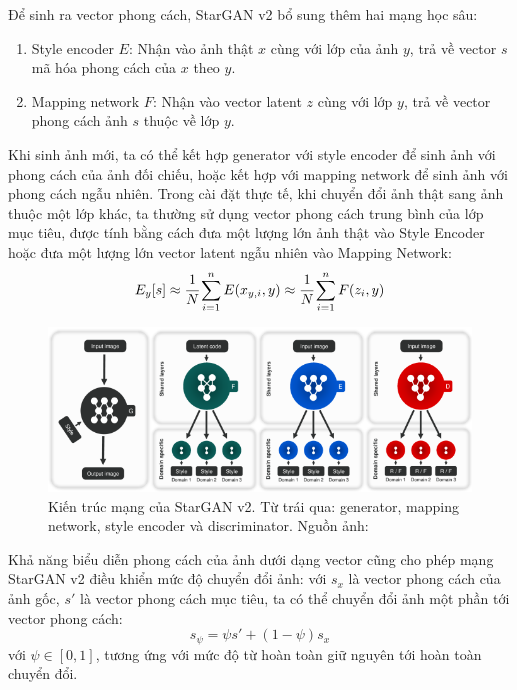 \documentclass[12pt]{extreport}
\begin{document}
Để sinh ra vector phong cách, StarGAN v2 bổ sung thêm hai mạng học sâu:
\begin{enumerate}
    \item Style encoder $ E $: Nhận vào ảnh thật $ x $ cùng với lớp của ảnh $ y $, trả về vector $ s $ mã hóa phong cách của $ x $ theo $ y $.
    \item Mapping network $ F $: Nhận vào vector latent $ z $ cùng với lớp $ y $, trả về vector phong cách ảnh $ s $ thuộc về lớp $ y $.
\end{enumerate}
Khi sinh ảnh mới, ta có thể kết hợp generator với style encoder để sinh ảnh với phong cách của ảnh đối chiếu, hoặc kết hợp với mapping network để sinh ảnh với phong cách ngẫu nhiên. Trong cài đặt thực tế, khi chuyển đổi ảnh thật sang ảnh thuộc một lớp khác, ta thường sử dụng vector phong cách trung bình của lớp mục tiêu, được tính bằng cách đưa một lượng lớn ảnh thật vào Style Encoder hoặc đưa một lượng lớn vector latent ngẫu nhiên vào Mapping Network:
$$ E_y[s] \approx \cfrac{1}{N} \sum_{i = 1}^{n} E(x_{y, i}, y) \approx \cfrac{1}{N} \sum_{i = 1}^{n} F(z_{i}, y) $$

\begin{figure}[H]
    \centering
    \includegraphics[width=\linewidth]{figure23.png}
    \caption{Kiến trúc mạng của StarGAN v2. Từ trái qua: generator, mapping network, style encoder và discriminator. Nguồn ảnh: \cite{choi2020stargan}}
\end{figure}

Khả năng biểu diễn phong cách của ảnh dưới dạng vector cũng cho phép mạng StarGAN v2 điều khiển mức độ chuyển đổi ảnh: với $ s_{x} $ là vector phong cách của ảnh gốc, $ s' $ là vector phong cách mục tiêu, ta có thể chuyển đổi ảnh một phần tới vector phong cách:
$$ s_{\psi} = \psi s' + (1 - \psi) s_{x} $$
với $ \psi \in [0, 1] $, tương ứng với mức độ từ hoàn toàn giữ nguyên tới hoàn toàn chuyển đổi.
\end{document}
